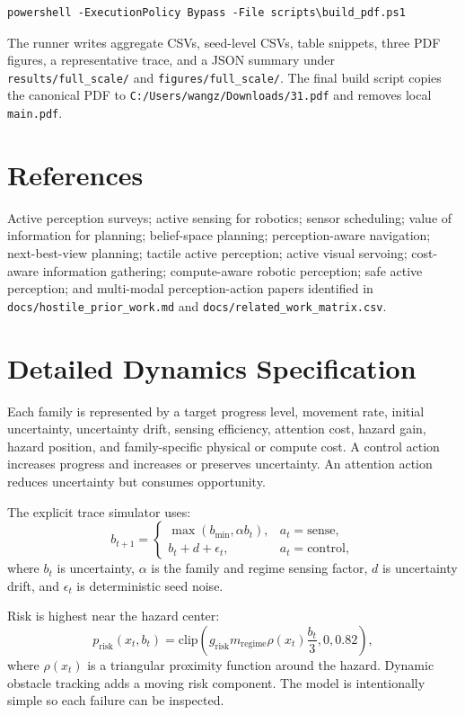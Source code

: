 \documentclass{article}
\begin{document}
\begin{verbatim}
powershell -ExecutionPolicy Bypass -File scripts\build_pdf.ps1
\end{verbatim}

The runner writes aggregate CSVs, seed-level CSVs, table snippets, three PDF
figures, a representative trace, and a JSON summary under
\texttt{results/full\_scale/} and \texttt{figures/full\_scale/}. The final
build script copies the canonical PDF to
\texttt{C:/Users/wangz/Downloads/31.pdf} and removes local \texttt{main.pdf}.

\section*{References}
\small
Active perception surveys; active sensing for robotics; sensor scheduling;
value of information for planning; belief-space planning; perception-aware
navigation; next-best-view planning; tactile active perception; active visual
servoing; cost-aware information gathering; compute-aware robotic perception;
safe active perception; and multi-modal perception-action papers identified in
\texttt{docs/hostile\_prior\_work.md} and
\texttt{docs/related\_work\_matrix.csv}.

\appendix
\renewcommand{\thesection}{\arabic{section}}

\section{Detailed Dynamics Specification}

Each family is represented by a target progress level, movement rate, initial
uncertainty, uncertainty drift, sensing efficiency, attention cost, hazard
gain, hazard position, and family-specific physical or compute cost. A control
action increases progress and increases or preserves uncertainty. An attention
action reduces uncertainty but consumes opportunity.

The explicit trace simulator uses:
\[
    b_{t+1} =
    \begin{cases}
    \max(b_{\min}, \alpha b_t), & a_t=\mathrm{sense}, \\
    b_t + d + \epsilon_t, & a_t=\mathrm{control},
    \end{cases}
\]
where $b_t$ is uncertainty, $\alpha$ is the family and regime sensing factor,
$d$ is uncertainty drift, and $\epsilon_t$ is deterministic seed noise.

Risk is highest near the hazard center:
\[
    p_{\mathrm{risk}}(x_t,b_t)
    =
    \mathrm{clip}
    \left(
    g_{\mathrm{risk}}
    m_{\mathrm{regime}}
    \rho(x_t)
    \frac{b_t}{3},
    0,
    0.82
    \right),
\]
where $\rho(x_t)$ is a triangular proximity function around the hazard. Dynamic
obstacle tracking adds a moving risk component. The model is intentionally
simple so each failure can be inspected.
\end{document}
